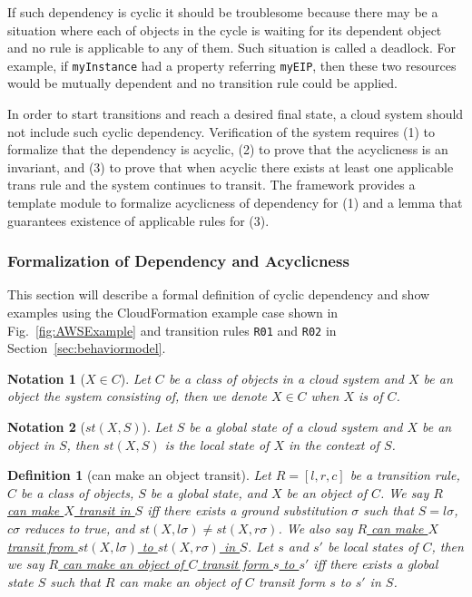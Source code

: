 \documentclass[12pt]{report}
\newtheorem{notation}{Notation}
\newtheorem{definition}{Definition}
\newcommand{\ul}{\underline}
\begin{document}
If such dependency is cyclic it should be troublesome because there
may be a situation where each of objects in the cycle is waiting for
its dependent object and no rule is applicable to any of them. Such
situation is called a deadlock.  For example, if {\tt myInstance} had
a property referring {\tt myEIP}, then these two resources would be
mutually dependent and no transition rule could be applied.

In order to start transitions and reach a desired final state, a cloud
system should not include such cyclic dependency. Verification of the
system requires (1) to formalize that the dependency is acyclic, (2)
to prove that the acyclicness is an invariant, and (3) to prove that
when acyclic there exists at least one applicable trans rule and the
system continues to transit. The framework provides a template module
to formalize acyclicness of dependency for (1) and a lemma that
guarantees existence of applicable rules for (3).

\subsubsection{Formalization of Dependency and Acyclicness}
This section will describe a formal definition of cyclic dependency
and show examples using the CloudFormation example case shown in
Fig.~\ref{fig:AWSExample} and transition rules {\tt R01} and {\tt R02}
in Section~\ref{sec:behaviormodel}.

\begin{notation}[$X \in C$]
Let $C$ be a class of objects in a cloud system and $X$ be an object
the system consisting of, then we denote \ul{$X \in C$} when $X$ is of
$C$.
\end{notation}

\begin{notation}[$st(X,S)$]
Let $S$ be a global state of a cloud system and $X$ be an object in
$S$, then \ul{$st(X,S)$} is the local state of $X$ in the context of
$S$.
\end{notation}

\begin{definition}[can make an object transit]
Let $R = [l,r,c]$ be a transition rule, $C$ be a class of objects, $S$
be a global state, and $X$ be an object of $C$. We say \ul{$R$ can
  make $X$ transit in $S$} iff there exists a ground substitution
$\sigma$ such that $S = l\sigma$, $c\sigma$ reduces to true, and
$st(X,l\sigma) \ne st(X,r\sigma)$. We also say \ul{$R$ can make $X$
  transit from $st(X,l\sigma)$ to $st(X,r\sigma)$ in $S$}.  Let $s$
and $s'$ be local states of $C$, then we say \ul{$R$ can make an object
  of $C$ transit form $s$ to $s'$} iff there exists a global state $S$
such that $R$ can make an object of $C$ transit form $s$ to $s'$ in $S$.
\end{definition}
\end{document}
